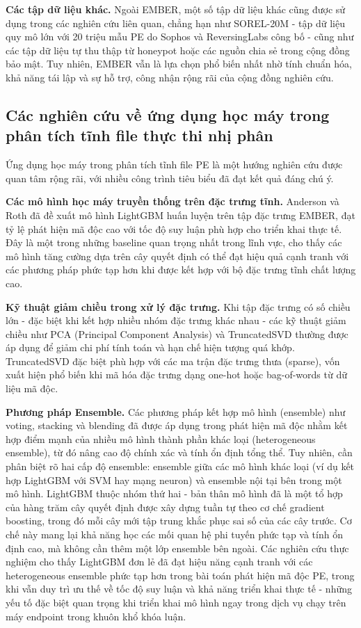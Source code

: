 \textbf{Các tập dữ liệu khác.}
Ngoài EMBER, một số tập dữ liệu khác cũng được sử dụng trong các
nghiên cứu liên quan, chẳng hạn như SOREL-20M \cite{sorel20m} -
tập dữ liệu quy mô lớn với 20 triệu mẫu PE do Sophos và ReversingLabs
công bố - cũng như các tập dữ liệu tự thu thập từ honeypot hoặc các nguồn
chia sẻ trong cộng đồng bảo mật. Tuy nhiên, EMBER vẫn là lựa chọn
phổ biến nhất nhờ tính chuẩn hóa, khả năng tái lập và sự hỗ trợ,
công nhận rộng rãi của cộng đồng nghiên cứu.

\subsection{Các nghiên cứu về ứng dụng học máy trong phân tích tĩnh file thực thi nhị phân}

Ứng dụng học máy trong phân tích tĩnh file PE là một hướng nghiên cứu
được quan tâm rộng rãi, với nhiều công trình tiêu biểu đã đạt kết quả
đáng chú ý.
 
\textbf{Các mô hình học máy truyền thống trên đặc trưng tĩnh.}
Anderson và Roth \cite{ember2018} đã đề xuất mô hình LightGBM huấn
luyện trên tập đặc trưng EMBER, đạt tỷ lệ phát hiện mã độc cao với
tốc độ suy luận phù hợp cho triển khai thực tế. Đây là một trong
những baseline quan trọng nhất trong lĩnh vực, cho thấy các mô hình
tăng cường dựa trên cây quyết định có thể đạt hiệu quả cạnh tranh
với các phương pháp phức tạp hơn khi được kết hợp với bộ đặc trưng
tĩnh chất lượng cao.

\textbf{Kỹ thuật giảm chiều trong xử lý đặc trưng.}
Khi tập đặc trưng có số chiều lớn - đặc biệt khi kết hợp nhiều
nhóm đặc trưng khác nhau - các kỹ thuật giảm chiều như PCA
(Principal Component Analysis) \cite{pca} và TruncatedSVD
\cite{truncatedsvd} thường được áp dụng để giảm chi phí tính toán và
hạn chế hiện tượng quá khớp. TruncatedSVD đặc biệt phù hợp với các
ma trận đặc trưng thưa (sparse), vốn xuất hiện phổ biến khi mã hóa
đặc trưng dạng one-hot hoặc bag-of-words từ dữ liệu mã độc.

\textbf{Phương pháp Ensemble.}
Các phương pháp kết hợp mô hình (ensemble) như voting, stacking và
blending \cite{ensemble_survey} đã được áp dụng trong phát hiện mã
độc nhằm kết hợp điểm mạnh của nhiều mô hình thành phần khác loại
(heterogeneous ensemble), từ đó nâng cao độ chính xác và tính ổn định
tổng thể. Tuy nhiên, cần phân biệt rõ hai cấp độ ensemble: ensemble
giữa các mô hình khác loại (ví dụ kết hợp LightGBM với SVM hay mạng
neuron) và ensemble nội tại bên trong một mô hình. LightGBM thuộc
nhóm thứ hai - bản thân mô hình đã là một tổ hợp của hàng trăm cây
quyết định được xây dựng tuần tự theo cơ chế gradient boosting, trong
đó mỗi cây mới tập trung khắc phục sai số của các cây trước. Cơ chế
này mang lại khả năng học các mối quan hệ phi tuyến phức tạp và tính
ổn định cao, mà không cần thêm một lớp ensemble bên ngoài. Các nghiên
cứu thực nghiệm \cite{ember2018, sorel20m} cho thấy LightGBM đơn lẻ
đã đạt hiệu năng cạnh tranh với các heterogeneous ensemble phức tạp
hơn trong bài toán phát hiện mã độc PE, trong khi vẫn duy trì ưu thế
về tốc độ suy luận và khả năng triển khai thực tế - những yếu tố
đặc biệt quan trọng khi triển khai mô hình ngay trong
dịch vụ chạy trên máy endpoint trong khuôn khổ khóa luận.

